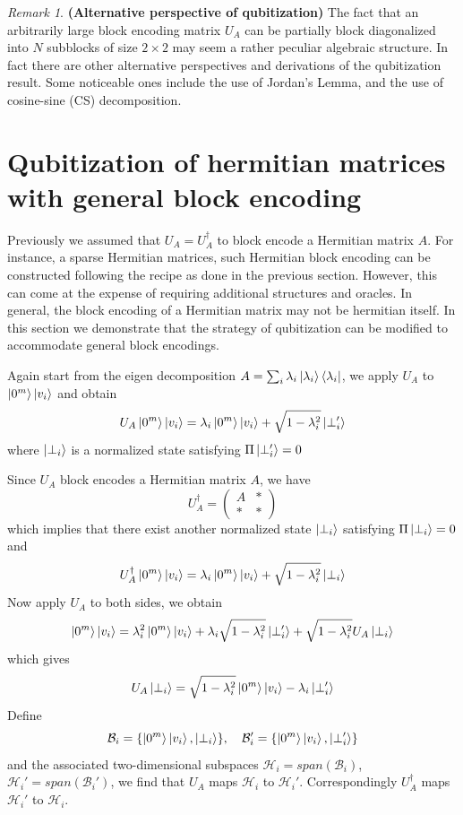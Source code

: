 \documentclass[12pt, oneside]{book}
\theoremstyle{definition}
\theoremstyle{definition}
\theoremstyle{remark}
\newtheorem*{remark}{Remark}
\begin{document}
\begin{remark}
    \textbf{(Alternative perspective of qubitization)} The fact that an arbitrarily large block encoding matrix $U_A$ can be partially block diagonalized into $N$ subblocks of size $2 \times 2$ may seem a rather peculiar algebraic structure. In fact there are other alternative perspectives and derivations of the qubitization result. Some noticeable ones include the use of Jordan's Lemma, and the use of cosine-sine (CS) decomposition.
\end{remark}

\section{Qubitization of hermitian matrices with general block encoding}
Previously we assumed that $U_A=U_A^{\dagger}$ to block encode a Hermitian matrix $A$. For instance, a sparse Hermitian matrices, such Hermitian block encoding can be constructed following the recipe as done in the previous section. However, this can come at the expense of requiring additional structures and oracles. In general, the block encoding of a Hermitian matrix may not be hermitian itself. In this section we demonstrate that the strategy of qubitization can be modified to accommodate general block encodings.

Again start from the eigen decomposition $A=\sum_i \lambda_i \ket{\lambda_i}\bra{\lambda_i}$, we apply $U_A$ to $\ket{0^m}\ket{v_i}$ and obtain
\[
U_A\ket{0^m}\ket{v_i} =\lambda_i \ket{0^m}\ket{v_i} + \sqrt{1-\lambda_i^2} \ket{\perp_i'}
\]
where $\ket{\perp_i}$ is a normalized state satisfying $\Pi\ket{\perp_i'}=0$

Since $U_A$ block encodes a Hermitian matrix $A$, we have
\[
U_A^{\dagger} = \begin{pmatrix} A & * \\ * & * \end{pmatrix}
\]
which implies that there exist another normalized state $\ket{\perp_i}$ satisfying $\Pi\ket{\perp_i}=0$ and
\[
U_A^{\dagger} \ket{0^m}\ket{v_i}=\lambda_i \ket{0^m}\ket{v_i} + \sqrt{1-\lambda_i^2}\ket{\perp_i}
\]
Now apply $U_A$ to both sides, we obtain
\[
\ket{0^m}\ket{v_i} = \lambda_i^2 \ket{0^m}\ket{v_i}+\lambda_i\sqrt{1-\lambda_i^2}\ket{\perp_i'} +\sqrt{1-\lambda_i^2}U_A\ket{\perp_i}
\]
which gives
\[
U_A\ket{\perp_i} = \sqrt{1-\lambda_i^2}\ket{0^m}\ket{v_i}-\lambda_i \ket{\perp_i'}
\]
Define
\[
\mathcal{B}_i =\{\ket{0^m}\ket{v_i},\ket{\perp_i}\}, \quad \mathcal{B}_i' = \{\ket{0^m}\ket{v_i},\ket{\perp_i'}\}
\]
and the associated two-dimensional subspaces $\mathcal{H}_i=span(\mathcal{B}_i)$, $\mathcal{H}_i' = span(\mathcal{B}_i')$, we find that $U_A$ maps $\mathcal{H}_i$ to $\mathcal{H}_i'$. Correspondingly $U_A^{\dagger}$ maps $\mathcal{H}_i'$ to $\mathcal{H}_i$.
\end{document}
